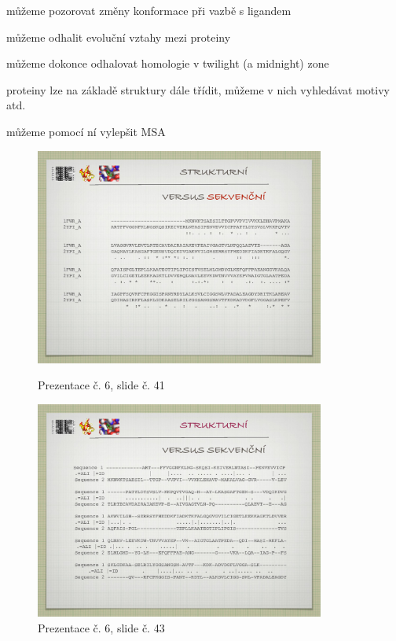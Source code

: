 \documentclass[DIV=8]{scrreprt}
\begin{document}
\begin{myItemize}[nosep]
    \item můžeme pozorovat změny konformace při vazbě s ligandem
    \item můžeme odhalit evoluční vztahy mezi proteiny
\begin{myItemize}[nosep]
    \item můžeme dokonce odhalovat homologie v twilight (a midnight) zone
\end{myItemize}

    \item proteiny lze na základě struktury dále třídit, můžeme v nich vyhledávat motivy atd.
    \item můžeme pomocí ní vylepšit MSA \begin{figure}
    \caption{Prezentace č. 6, slide č. 41}
    \includegraphics[width=0.85\textwidth]{slides-6/slide-41.jpg}
    \centering
    \label{slides-6-slide-41}
\end{figure}
\begin{figure}
    \caption{Prezentace č. 6, slide č. 43}
    \includegraphics[width=0.85\textwidth]{slides-6/slide-43.jpg}

\end{figure}
\end{myItemize}
\end{document}
